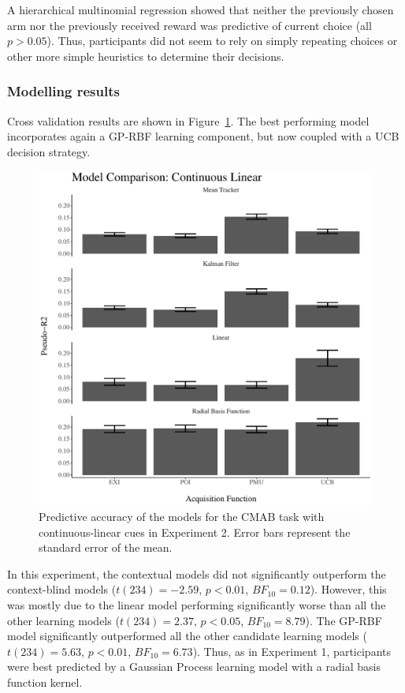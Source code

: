 \documentclass[a4paper,natbib]{apa6}
\begin{document}
A hierarchical multinomial regression showed that neither the previously chosen arm nor the previously received reward was predictive of current choice (all $p>0.05$). Thus, participants did not seem to rely on simply repeating choices or other more simple heuristics to determine their decisions.

\subsubsection{Modelling results}

Cross validation results are shown in Figure~\ref{fig:results2}. The best performing model incorporates again a GP-RBF learning component, but now coupled with a UCB decision strategy.  
%
\begin{figure}[ht!]
\centering
\includegraphics[scale=0.55]{modelcomparison2.pdf}
\caption{Predictive accuracy of the models for the CMAB task with continuous-linear cues in Experiment 2. Error bars represent the standard error of the mean.}
\label{fig:results2}
\end{figure}
%
In this experiment, the contextual models did not  significantly outperform the context-blind models ($t(234)=-2.59$, $p<0.01$, $BF_{10}= 0.12$). However, this was mostly due to the linear model performing significantly worse than all the other learning models ($t(234)=2.37$, $p<0.05$, $BF_{10}= 8.79$). The GP-RBF model significantly outperformed all the other candidate learning models ($t(234)= 5.63$, $p<0.01$, $BF_{10}=6.73$). Thus, as in Experiment 1, participants were best predicted by a Gaussian Process learning model with a radial basis function kernel. 
\end{document}

